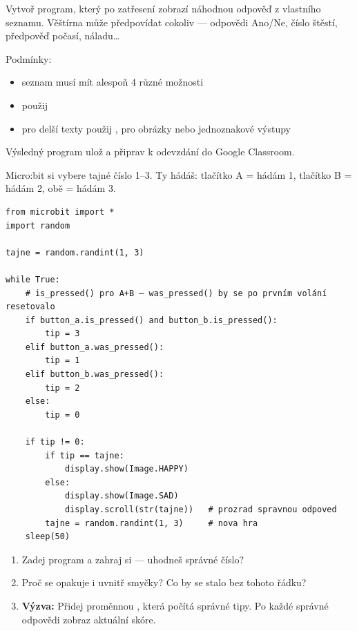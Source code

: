 \begin{ukol}[Věštírna]

Vytvoř program, který po zatřesení zobrazí náhodnou odpověď z vlastního seznamu.
Věštírna může předpovídat cokoliv — odpovědi Ano/Ne, číslo štěstí, předpověď
počasí, náladu\ldots

\medskip
Podmínky:
\begin{itemize}
  \item seznam musí mít alespoň 4 různé možnosti
  \item použij 
  \item pro delší texty použij ,
        pro obrázky nebo jednoznakové výstupy 
\end{itemize}

\odpoved[4.5cm]

\noindent Výsledný program ulož a připrav k odevzdání do Google Classroom.

\end{ukol}

\begin{bonusukol}

Micro:bit si vybere tajné číslo 1–3. Ty hádáš: tlačítko A = hádám 1,
tlačítko B = hádám 2, obě = hádám 3.

\begin{lstlisting}
from microbit import *
import random

tajne = random.randint(1, 3)

while True:
    # is_pressed() pro A+B — was_pressed() by se po prvním volání resetovalo
    if button_a.is_pressed() and button_b.is_pressed():
        tip = 3
    elif button_a.was_pressed():
        tip = 1
    elif button_b.was_pressed():
        tip = 2
    else:
        tip = 0

    if tip != 0:
        if tip == tajne:
            display.show(Image.HAPPY)
        else:
            display.show(Image.SAD)
            display.scroll(str(tajne))   # prozrad spravnou odpoved
        tajne = random.randint(1, 3)     # nova hra
    sleep(50)
\end{lstlisting}

\begin{enumerate}
  \item Zadej program a zahraj si — uhodneš správné číslo?
  \item Proč se  opakuje i uvnitř smyčky?
        Co by se stalo bez tohoto řádku?
  \item \textbf{Výzva:} Přidej proměnnou , která počítá správné tipy.
        Po každé správné odpovědi zobraz aktuální skóre.
\end{enumerate}

\odpoved[2.5cm]

\end{bonusukol}


